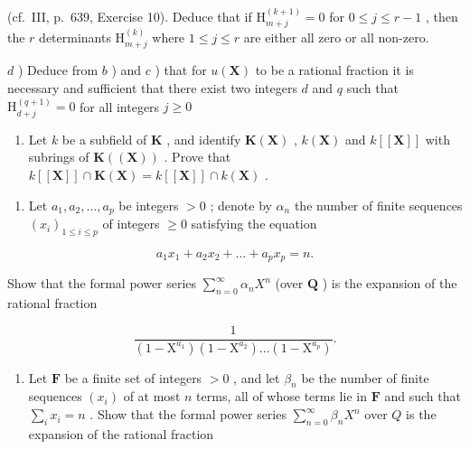 (cf.~III, p.~639, Exercise 10). Deduce that if \(\mathrm{H}_{m+j}^{(k+1)} = 0\) for \(0 \leqslant j \leqslant r-1\) , then the \(r\) determinants \(\mathrm{H}_{m+j}^{(k)}\) where \(1 \leqslant j \leqslant r\) are either all zero or all non-zero.

\(d\) ) Deduce from \(b\) ) and \(c\) ) that for \(u(\mathbf{X})\) to be a rational fraction it is necessary and sufficient that there exist two integers \(d\) and \(q\) such that \(\mathrm{H}_{d + j}^{(q + 1)} = 0\) for all integers \(j\geqslant 0\)

\begin{enumerate}
\def\labelenumi{\alph{enumi})}
\setcounter{enumi}{4}
\tightlist
\item
  Let \(k\) be a subfield of \(\mathbf{K}\) , and identify \(\mathbf{K}(\mathbf{X})\) , \(k(\mathbf{X})\) and \(k[[\mathbf{X}]]\) with subrings of \(\mathbf{K}((\mathbf{X}))\) . Prove that \(k[[\mathbf{X}]] \cap \mathbf{K}(\mathbf{X}) = k[[\mathbf{X}]] \cap k(\mathbf{X})\) .
\end{enumerate}

\begin{enumerate}
\def\labelenumi{\arabic{enumi})}
\setcounter{enumi}{1}
\tightlist
\item
  Let \(a_1, a_2, \ldots, a_p\) be integers \(> 0\) ; denote by \(\alpha_n\) the number of finite sequences \((x_i)_{1 \leqslant i \leqslant p}\) of integers \(\geqslant 0\) satisfying the equation
\end{enumerate}

\[
a _ {1} x _ {1} + a _ {2} x _ {2} + \dots + a _ {p} x _ {p} = n.
\]

Show that the formal power series \(\sum_{n=0}^{\infty} \alpha_n X^n\) (over \(\mathbf{Q}\) ) is the expansion of the rational fraction

\[
\frac {1}{(1 - \mathrm{X} ^ {a _ {1}}) (1 - \mathrm{X} ^ {a _ {2}}) \dots (1 - \mathrm{X} ^ {a _ {p}})}.
\]

\begin{enumerate}
\def\labelenumi{\arabic{enumi})}
\setcounter{enumi}{2}
\tightlist
\item
  Let \(\mathbf{F}\) be a finite set of integers \(> 0\) , and let \(\beta_{n}\) be the number of finite sequences \((x_{i})\) of at most \(n\) terms, all of whose terms lie in \(\mathbf{F}\) and such that \(\sum_{i} x_{i} = n\) . Show that the formal power series \(\sum_{n=0}^{\infty} \beta_n X^n\) over \(Q\) is the expansion of the rational fraction
\end{enumerate}

